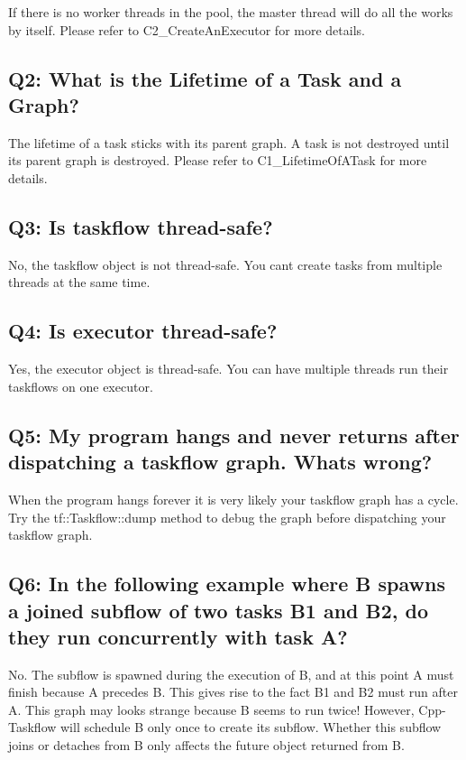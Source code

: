 If there is no worker threads in the pool, the master thread will do all the works by itself. Please refer to C2\+\_\+\+Create\+An\+Executor for more details.\hypertarget{_f_a_q_ProgrammingQuestions2}{}\subsection{Q2\+: What is the Lifetime of a Task and a Graph?}\label{_f_a_q_ProgrammingQuestions2}
The lifetime of a task sticks with its parent graph. A task is not destroyed until its parent graph is destroyed. Please refer to C1\+\_\+\+Lifetime\+Of\+A\+Task for more details.\hypertarget{_f_a_q_ProgrammingQuestions3}{}\subsection{Q3\+: Is taskflow thread-\/safe?}\label{_f_a_q_ProgrammingQuestions3}
No, the taskflow object is not thread-\/safe. You can\textquotesingle{}t create tasks from multiple threads at the same time.\hypertarget{_f_a_q_ProgrammingQuestions4}{}\subsection{Q4\+: Is executor thread-\/safe?}\label{_f_a_q_ProgrammingQuestions4}
Yes, the executor object is thread-\/safe. You can have multiple threads run their taskflows on one executor.\hypertarget{_f_a_q_ProgrammingQuestions5}{}\subsection{Q5\+: My program hangs and never returns after dispatching a taskflow graph. What\textquotesingle{}s wrong?}\label{_f_a_q_ProgrammingQuestions5}
When the program hangs forever it is very likely your taskflow graph has a cycle. Try the tf\+::\+Taskflow\+::dump method to debug the graph before dispatching your taskflow graph.\hypertarget{_f_a_q_ProgrammingQuestions6}{}\subsection{Q6\+: In the following example where B spawns a joined subflow of two tasks B1 and B2, do they run concurrently with task A?}\label{_f_a_q_ProgrammingQuestions6}


No. The subflow is spawned during the execution of B, and at this point A must finish because A precedes B. This gives rise to the fact B1 and B2 must run after A. This graph may looks strange because B seems to run twice! However, Cpp-\/\+Taskflow will schedule B only once to create its subflow. Whether this subflow joins or detaches from B only affects the future object returned from B. 